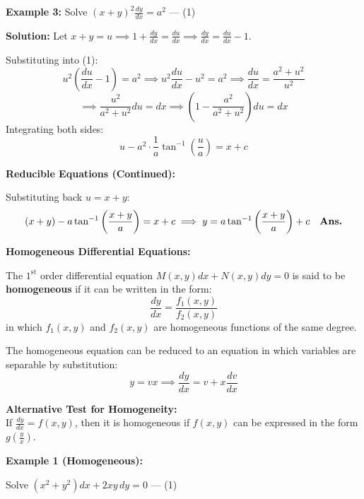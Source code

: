 \documentclass[11pt,a4paper]{article}
\newcommand{\Heading}[1]{\vspace{0.3cm}\noindent\textbf{\textcolor{AcademicGreen}{\large #1}}\par\vspace{0.15cm}}
\begin{document}
\vspace{0.3cm}
\begin{tcolorbox}[greenbox]
    \textbf{\textcolor{AcademicGreen}{Example 3:}} Solve $(x + y)^2 \frac{dy}{dx} = a^2$ \quad --- (1)
    
    \vspace{0.2cm}
    \noindent\textbf{Solution:} Let $x + y = u \implies 1 + \frac{dy}{dx} = \frac{du}{dx} \implies \frac{dy}{dx} = \frac{du}{dx} - 1$.
    
    \noindent Substituting into (1):
    \[
    u^2 \left(\frac{du}{dx} - 1\right) = a^2 \implies u^2 \frac{du}{dx} - u^2 = a^2 \implies \frac{du}{dx} = \frac{a^2 + u^2}{u^2}
    \]
    \[
    \implies \frac{u^2}{a^2 + u^2} du = dx \implies \left(1 - \frac{a^2}{a^2 + u^2}\right) du = dx
    \]
    Integrating both sides:
    \[
    u - a^2 \cdot \frac{1}{a} \tan^{-1}\left(\frac{u}{a}\right) = x + c
    \]
\end{tcolorbox}

\newpage

\Heading{Reducible Equations (Continued):}
Substituting back $u = x + y$:
\[
(x + y) - a \tan^{-1}\left(\frac{x + y}{a}\right) = x + c \implies y = a \tan^{-1}\left(\frac{x + y}{a}\right) + c \quad \text{\textbf{Ans.}}
\]

\vspace{0.4cm}
\Heading{Homogeneous Differential Equations:}
The $1^{\text{st}}$ order differential equation $M(x,y)dx + N(x,y)dy = 0$ is said to be \textbf{homogeneous} if it can be written in the form:
\[
\frac{dy}{dx} = \frac{f_1(x,y)}{f_2(x,y)}
\]
in which $f_1(x,y)$ and $f_2(x,y)$ are homogeneous functions of the same degree.

\vspace{0.15cm}
\noindent The homogeneous equation can be reduced to an equation in which variables are separable by substitution:
\[
y = vx \implies \frac{dy}{dx} = v + x\frac{dv}{dx}
\]
\begin{tcolorbox}[greenbox]
    \textbf{Alternative Test for Homogeneity:} \\
    If $\frac{dy}{dx} = f(x,y)$, then it is homogeneous if $f(x,y)$ can be expressed in the form $g\left(\frac{y}{x}\right)$.
\end{tcolorbox}

\vspace{0.3cm}
\Heading{Example 1 (Homogeneous):}
Solve $(x^2 + y^2)dx + 2xy \, dy = 0$ \quad --- (1)
\end{document}

